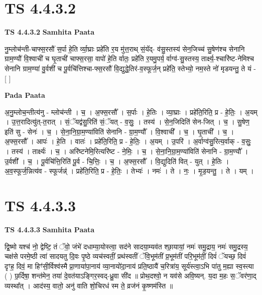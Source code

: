 \documentclass[17pt]{extarticle}
\begin{document}
\section*{ TS 4.4.3.2 }

\textbf{TS 4.4.3.2 } \newline
\textbf{Samhita Paata} \newline

नु॒म्लोच॑न्ती-चाफ्स॒रसौ॑ स॒र्पा हे॒ति र्व्या॒घ्राः प्रहे॑ति र॒य मु॑त्त॒राथ् सं॒यॅद्- व॑सु॒स्तस्य॑ सेन॒जिच्च॑ सु॒षेण॑श्च सेनानि ग्राम॒ण्यौ॑ वि॒श्वाची॑ च घृ॒ताची॑ चाफ्स॒रसा॒ वापो॑ हे॒ति र्वातः॒ प्रहे॑ति र॒यमु॒पर्य॒ र्वाग्व॑-सु॒स्तस्य॒ तार्क्ष्य॒-श्चारि॑ष्ट-नेमिश्च सेनानि ग्राम॒ण्या॑ वु॒र्वशी॑ च पू॒र्वचि॑त्तिश्चा-फ्स॒रसौ॑ वि॒द्युद्धे॒तिर॑-व॒स्फूर्ज॒न् प्रहे॑ति॒ स्तेभ्यो॒ नम॒स्ते नो॑ मृडयन्तु॒ ते यं - [  ] \newline

\textbf{Pada Paata} \newline

अ॒नु॒म्लोच॒न्तीत्य॑नु - म्लोच॑न्ती । च॒ । अ॒फ्स॒रसौ᳚ । स॒र्पाः । हे॒तिः । व्या॒घ्राः । प्रहे॑ति॒रिति॒ प्र - हे॒तिः॒ । अ॒यम् । उ॒त्त॒रादित्यु॑त्-त॒रात् । सं॒ॅयद्व॑सु॒रिति॑ सं॒ॅयत् - व॒सुः॒ । तस्य॑ । से॒न॒जिदिति॑ सेन-जित् । च॒ । सु॒षेण॒ इति॑ सु - सेनः॑ । च॒ । से॒ना॒नि॒ग्रा॒म॒ण्या॑विति॑ सेनानि - ग्रा॒म॒ण्यौ᳚ । वि॒श्वाची᳚ । च॒ । घृ॒ताची᳚ । च॒ । अ॒फ्स॒रसौ᳚ । आपः॑ । हे॒ति । वातः॑ । प्रहे॑ति॒रिति॒ प्र - हे॒तिः॒ । अ॒यम् । उ॒परि॑ । अ॒र्वाग्व॑सु॒रित्य॒र्वाक् - व॒सुः॒ । तस्य॑ । तार्क्ष्यः॑ । च॒ । अरि॑ष्टनेमि॒रित्यरि॑ष्ट - ने॒मिः॒ । च॒ । से॒ना॒नि॒ग्रा॒म॒ण्या॑विति॑ सेनानि - ग्रा॒म॒ण्यौ᳚ । उ॒र्वशी᳚ । च॒ । पू॒र्वचि॑त्ति॒रिति॑ पू॒र्व - चि॒त्तिः॒ । च॒ । अ॒फ्स॒रसौ᳚ । वि॒द्युदिति॑ वित् - युत् । हे॒तिः । अ॒व॒स्फूर्ज॒न्नित्य॑व - स्फूर्जन्न्॑ । प्रहे॑ति॒रिति॒ प्र - हे॒तिः॒ । तेभ्यः॑ । नमः॑ । ते । नः॒ । मृ॒ड॒यन्तु॒ । ते । यम् ।  \newline




\section*{ TS 4.4.3.3 }

\textbf{TS 4.4.3.3 } \newline
\textbf{Samhita Paata} \newline

द्वि॒ष्मो यश्च॑ नो॒ द्वेष्टि॒ तं ॅवो॒ जंभे॑ दधाम्या॒योस्त्वा॒ सद॑ने सादया॒म्यव॑त श्छा॒यायां॒ नमः॑ समु॒द्राय॒ नमः॑ समु॒द्रस्य॒ चक्ष॑से परमे॒ष्ठी त्वा॑ सादयतु दि॒वः पृ॒ष्ठे व्यच॑स्वतीं॒ प्रथ॑स्वतीं ॅवि॒भूम॑तीं प्र॒भूम॑तीं परि॒भूम॑तीं॒ दिवं॑ ॅयच्छ॒ दिवं॑ दृꣳह॒ दिवं॒ मा हिꣳ॑सी॒र्विश्व॑स्मै प्रा॒णाया॑पा॒नाय॑ व्या॒नायो॑दा॒नाय॑ प्रति॒ष्ठायै॑ च॒रित्रा॑य॒ सूर्य॑स्त्वा॒ऽभि पा॑तु म॒ह्या स्व॒स्त्या ( ) छ॒र्दिषा॒ शन्त॑मेन॒ तया॑ दे॒वत॑याऽङ्गिर॒स्वद्-ध्रु॒वा सी॑द ॥ प्रोथ॒दश्वो॒ न यव॑से अवि॒ष्यन्. य॒दा म॒हः स॒ॅवर॑णा॒द् व्यस्था᳚त् । आद॑स्य॒ वातो॒ अनु॑ वाति शो॒चिरध॑ स्म ते॒ व्रज॑नं कृ॒ष्णम॑स्ति ॥ \newline
\end{document}
